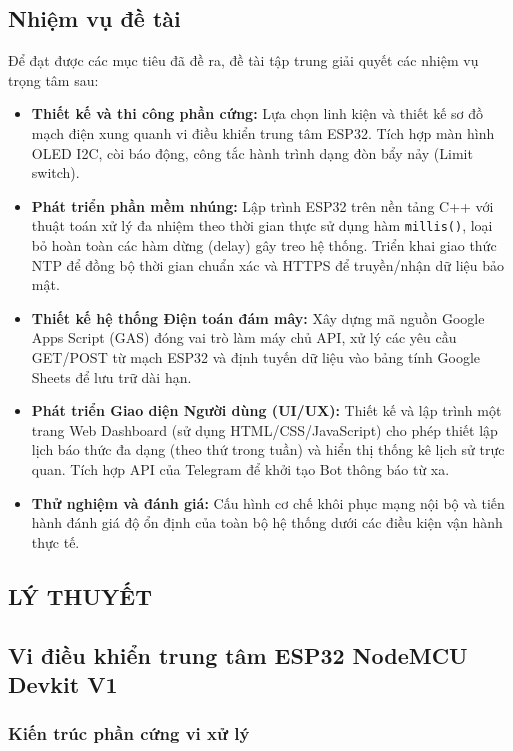 \documentclass[12pt, a4paper, oneside]{article}
\begin{document}
\subsection{Nhiệm vụ đề tài}
Để đạt được các mục tiêu đã đề ra, đề tài tập trung giải quyết các nhiệm vụ trọng tâm sau:
\begin{itemize}
    \item \textbf{Thiết kế và thi công phần cứng:} Lựa chọn linh kiện và thiết kế sơ đồ mạch điện xung quanh vi điều khiển trung tâm ESP32. Tích hợp màn hình OLED I2C, còi báo động, công tắc hành trình dạng đòn bẩy nảy (Limit switch).
    \item \textbf{Phát triển phần mềm nhúng:} Lập trình ESP32 trên nền tảng C++ với thuật toán xử lý đa nhiệm theo thời gian thực sử dụng hàm \texttt{millis()}, loại bỏ hoàn toàn các hàm dừng (delay) gây treo hệ thống. Triển khai giao thức NTP để đồng bộ thời gian chuẩn xác và HTTPS để truyền/nhận dữ liệu bảo mật.
    \item \textbf{Thiết kế hệ thống Điện toán đám mây:} Xây dựng mã nguồn Google Apps Script (GAS) đóng vai trò làm máy chủ API, xử lý các yêu cầu GET/POST từ mạch ESP32 và định tuyến dữ liệu vào bảng tính Google Sheets để lưu trữ dài hạn.
    \item \textbf{Phát triển Giao diện Người dùng (UI/UX):} Thiết kế và lập trình một trang Web Dashboard (sử dụng HTML/CSS/JavaScript) cho phép thiết lập lịch báo thức đa dạng (theo thứ trong tuần) và hiển thị thống kê lịch sử trực quan. Tích hợp API của Telegram để khởi tạo Bot thông báo từ xa.
    \item \textbf{Thử nghiệm và đánh giá:} Cấu hình cơ chế khôi phục mạng nội bộ và tiến hành đánh giá độ ổn định của toàn bộ hệ thống dưới các điều kiện vận hành thực tế.
\end{itemize}

\newpage
\begin{center}
    \section{LÝ THUYẾT}
\end{center}
\subsection{Vi điều khiển trung tâm ESP32 NodeMCU Devkit V1}
\subsubsection{Kiến trúc phần cứng vi xử lý}
\end{document}
